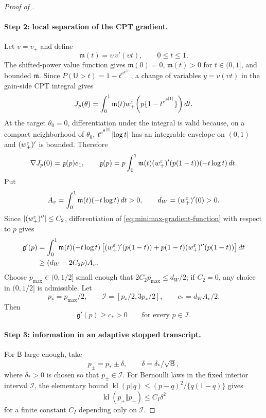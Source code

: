 \begin{proof}[Proof of ]
\paragraph{Step 2: local separation of the CPT gradient.}
Let $v=v_+$ and define
\[
 \mathfrak m(t)=\upsilon\,v'(\upsilon t),\qquad 0\le t\le1.
\]
The shifted-power value function gives $\mathfrak m(0)=0$, $\mathfrak m(t)>0$ for $t\in(0,1]$, and bounded $\mathfrak m$.  Since
$P(\mathsf U>t)=1-t^{e^{\theta^{[1]}}}$, a change of variables $y=v(\upsilon t)$ in the gain-side CPT integral gives
\begin{equation}\label{eq:minimax-cpt-submodel}
 J_p(\theta)
 =\int_0^1 \mathfrak m(t)
 w_+^\varepsilon\!\left(p\{1-t^{e^{\theta^{[1]}}}\}\right)dt.
\end{equation}
At the target $\theta_0=0$, differentiation under the integral is valid because, on a compact neighborhood of $\theta_0$,
$t^{e^{\theta^{[1]}}}\lvert\log t\rvert$ has an integrable envelope on $(0,1)$ and $(w_+^\varepsilon)'$ is bounded.  Therefore
\begin{equation}\label{eq:minimax-gradient-function}
 \nabla J_p(0)=\mathfrak g(p)e_1,
 \qquad
 \mathfrak g(p)
 =p\int_0^1\mathfrak m(t)(w_+^\varepsilon)'(p(1-t))(-t\log t)\,dt.
\end{equation}
Put
\[
 A_v=\int_0^1\mathfrak m(t)(-t\log t)\,dt>0,
 \qquad
 d_W=(w_+^\varepsilon)'(0)>0.
\]
Since $\lvert(w_+^\varepsilon)''\rvert\le C_2$, differentiation of \eqref{eq:minimax-gradient-function} with respect to $p$ gives
\begin{align*}
 \mathfrak g'(p)
 &=\int_0^1\mathfrak m(t)(-t\log t)
 \left[(w_+^\varepsilon)'(p(1-t))+p(1-t)(w_+^\varepsilon)''(p(1-t))\right]dt\\
 &\ge (d_W-2C_2p)A_v.
\end{align*}
Choose $p_{\max}\in(0,1/2]$ small enough that $2C_2p_{\max}\le d_W/2$; if $C_2=0$, any choice in $(0,1/2]$ is admissible.  Let
\[
 p_*=p_{\max}/2,
 \qquad
 \mathcal I=[p_*/2,3p_*/2],
 \qquad
 c_*=d_WA_v/2.
\]
Then
\begin{equation}\label{eq:minimax-gradient-separation}
 \mathfrak g'(p)\ge c_*>0
 \qquad\text{for every }p\in\mathcal I.
\end{equation}

\paragraph{Step 3: information in an adaptive stopped transcript.}
For $\mathsf B$ large enough, take
\[
 p_\pm=p_*\pm\delta,
 \qquad
 \delta=\delta_*/\sqrt{\mathsf B},
\]
where $\delta_*>0$ is chosen so that $p_\pm\in\mathcal I$.  For Bernoulli laws in the fixed interior interval $\mathcal I$, the elementary bound
$\operatorname{kl}(p\Vert q)\le (p-q)^2/\{q(1-q)\}$ gives
\begin{equation}\label{eq:bernoulli-kl-bound}
 \operatorname{kl}(p_+\Vert p_-)
 \le C_I\delta^2
\end{equation}
for a finite constant $C_I$ depending only on $\mathcal I$.


\end{proof}
